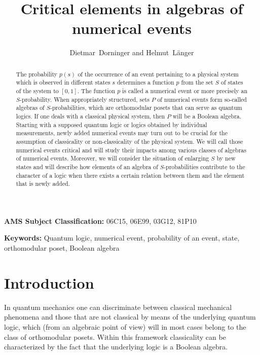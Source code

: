 \documentclass[12pt]{article}
\title{Critical elements in algebras of numerical events}
\author{Dietmar~Dorninger and Helmut~L\"anger}
\date{}
\begin{document}

\maketitle

\begin{abstract}
The probability $p(s)$ of the occurrence of an event pertaining to a physical system which is observed in different states $s$ determines a function $p$ from the set $S$ of states of the system to $[0,1]$. The function $p$ is called a numerical event or more precisely an $S$-probability. When appropriately structured, sets $P$ of numerical events form so-called algebras of $S$-probabilities, which are orthomodular posets that can serve as quantum logics. If one deals with a classical physical system, then $P$ will be a Boolean algebra. Starting with a supposed quantum logic or logics obtained by individual measurements, newly added numerical events may turn out to be crucial for the assumption of classicality or non-classicality of the physical system. We will call those numerical events critical and will study their impacts among various classes of algebras of numerical events. Moreover, we will consider the situation of enlarging $S$ by new states and will describe how elements of an algebra of $S$-probabilities contribute to the character of a logic when there exists a certain relation between them and the element that is newly added.
\end{abstract}

{\bf AMS Subject Classification:} 06C15, 06E99, 03G12, 81P10

{\bf Keywords:} Quantum logic, numerical event, probability of an event, state, orthomodular poset, Boolean algebra

\section{Introduction}

In quantum mechanics one can discriminate between classical mechanical phenomena and those that are not classical by means of the underlying quantum logic, which (from an algebraic point of view) will in most cases belong to the class of orthomodular posets. Within this framework classicality can be characterized by the fact that the underlying logic is a Boolean algebra.
\end{document}
